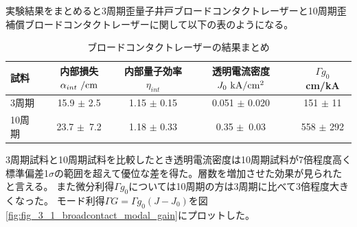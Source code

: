 {実験結果をまとめると3周期歪量子井戸ブロードコンタクトレーザーと10周期歪補償ブロードコンタクトレーザーに関して以下の表のようになる。
\begin{table}[h]
  \caption{ブロードコンタクトレーザーの結果まとめ}
  \label{table:table_I0}
  \centering
  \begin{tabular}{lcccc}
    \hline
    試料   &  内部損失$\alpha_{int}\  \rm{ /cm}$&内部量子効率$\eta_{int} $&透明電流密度 $J_{0} \ \rm{  kA/cm^2}$  &$\Gamma g_{0}$ cm/kA\\
    \hline \hline
     3周期 &   15.9 $\pm$ 2.5 &1.15 $\pm$ 0.15&0.051 $\pm$  0.020& 151 $\pm$ 11\\
    10周期 & 23.7 $\pm$\ 7.2&1.18 $\pm$ 0.33&0.35 $\pm$\ 0.03&558 $\pm$ 292\\
    \hline
  \end{tabular}
\end{table}
%

3周期試料と10周期試料を比較したとき透明電流密度は10周期試料が7倍程度高く標準偏差1$\sigma$の範囲を超えて優位な差を得た。層数を増加させた効果が見られたと言える。
また微分利得$\Gamma g_{0}$については10周期の方は3周期に比べて3倍程度大きくなった。
モード利得$\Gamma G=\Gamma g_{0}(J-J_{0})$を図\ref{fig:fig_3_1_broadcontact_modal_gain}にプロットした。

}
